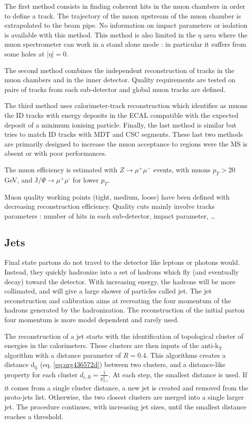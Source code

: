 The first method consists in finding coherent hits in the muon chambers in order to define a track.
The trajectory of the muon upstream of the muon chamber is extrapolated to the beam pipe.
No information on impact parameters or isolation is available with this method.
This method is also limited in the $\eta$ area where the muon spectrometer can work in a stand alone mode : in particular it suffers from some holes at $|\eta |=0$.

The second method combines the independent reconstruction of tracks in the muon chambers and in the inner detector.
Quality requirements are tested on pairs of tracks from each sub-detector and global muon tracks are defined.

The third method uses calorimeter-track reconstruction which identifies as muons the ID tracks with energy deposits in the ECAL compatible with the expected deposit of a minimum ionising particle.
Finally, the last method is similar but tries to match ID tracks with MDT and CSC segments.
These last two methods are primarily designed to increase the muon acceptance to regions were the MS is absent or with poor performances.

The muon efficiency is estimated with $Z\rightarrow \mu^+\mu^-$ events, with muons $p_T>20$ GeV, and J/\(\Psi \rightarrow \mu^{\text{+}} \mu\)\(^{\text{-}}\) for lower $p_T$.

Muon quality working points (tight, medium, loose) have been defined with decreasing reconstruction efficiency.
Quality cuts mainly involve tracks parameters : number of hits in each sub-detector, impact parameter, \ldots{}

\subsection{Jets}
\label{sec:org2ef168a}

Final state partons do not travel to the detector like leptons or photons would.
Instead, they quickly hadronize into a set of hadrons which fly (and eventually decay) toward the detector.
With increasing energy, the hadrons will be more collimated, and will give a large shower of particles called jet.
The jet reconstruction and calibration aims at recreating the four momentum of the hadrons generated by the hadronization.
The reconstruction of the initial parton four momentum is more model dependent and rarely used.

The reconstruction of a jet starts with the identification of topological cluster of energies \cite{CERN-PH-EP-2015-304} in the calorimeters.
These clusters are then inputs of the anti-k\(_{\text{T}}\) algorithm \cite{Cacciari:2008gp} with a distance parameter of $R=0.4$.
This algorithms creates a distance d\(_{\text{ij}}\) (eq. \ref{eq:org436572d}) between two clusters, and a distance-like property for each cluster \(d_{i,B} = \frac{1}{p_{T,i}^2}\).
At each step, the smallest distance is used.
If it comes from a single cluster distance, a new jet is created and removed from the proto-jets list.
Otherwise, the two closest clusters are merged into a single larger jet.
The procedure continues, with increasing jet sizes, until the smallest distance reaches a threshold.

